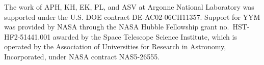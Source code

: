 \documentclass[modern]{descnote}
\begin{document}


The work of APH, KH, EK, PL, and ASV at Argonne National Laboratory was supported under the U.S. DOE contract DE-AC02-06CH11357.
Support for YYM was provided by NASA through the NASA Hubble Fellowship grant no.\ HST-HF2-51441.001 awarded by the Space Telescope Science Institute, which is operated by the Association of Universities for Research in Astronomy, Incorporated, under NASA contract NAS5-26555. 




\clearpage
{}
{}



\end{document}
